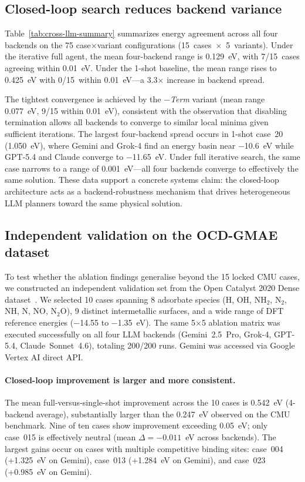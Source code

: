 \subsection{Closed-loop search reduces backend variance}

Table~\ref{tab:cross-llm-summary} summarizes energy agreement across all four backends on the 75 case$\times$variant configurations (15~cases~$\times$~5~variants).
Under the iterative full agent, the mean four-backend range is 0.129~eV, with 7/15~cases agreeing within 0.01~eV.
Under the 1-shot baseline, the mean range rises to 0.425~eV with 0/15~within 0.01~eV---a 3.3$\times$ increase in backend spread.

The tightest convergence is achieved by the \textit{$-$Term} variant (mean range 0.077~eV, 9/15 within 0.01~eV), consistent with the observation that disabling termination allows all backends to converge to similar local minima given sufficient iterations.
The largest four-backend spread occurs in 1-shot case~20 (1.050~eV), where Gemini and Grok-4 find an energy basin near $-$10.6~eV while GPT-5.4 and Claude converge to $-$11.65~eV.
Under full iterative search, the same case narrows to a range of 0.001~eV---all four backends converge to effectively the same solution.
These data support a concrete systems claim: the closed-loop architecture acts as a backend-robustness mechanism that drives heterogeneous LLM planners toward the same physical solution.

\subsection{Independent validation on the OCD-GMAE dataset}

To test whether the ablation findings generalise beyond the 15 locked CMU cases, we constructed an independent validation set from the Open Catalyst 2020 Dense dataset~\cite{lan2023adsorbml}.
We selected 10 cases spanning 8 adsorbate species (H, OH, NH$_2$, N$_2$, NH, N, NO, N$_2$O), 9 distinct intermetallic surfaces, and a wide range of DFT reference energies ($-$14.55 to $-$1.35~eV).
The same 5$\times$5 ablation matrix was executed successfully on all four LLM backends (Gemini~2.5~Pro, Grok-4, GPT-5.4, Claude~Sonnet~4.6), totaling 200/200 runs. Gemini was accessed via Google Vertex AI direct API.



\paragraph{Closed-loop improvement is larger and more consistent.}
The mean full-versus-single-shot improvement across the 10 cases is 0.542~eV (4-backend average), substantially larger than the 0.247~eV observed on the CMU benchmark.
Nine of ten cases show improvement exceeding 0.05~eV; only case~015 is effectively neutral (mean $\Delta = -0.011$~eV across backends).
The largest gains occur on cases with multiple competitive binding sites: case~004 (+1.325~eV on Gemini), case~013 (+1.284~eV on Gemini), and case~023 (+0.985~eV on Gemini).

